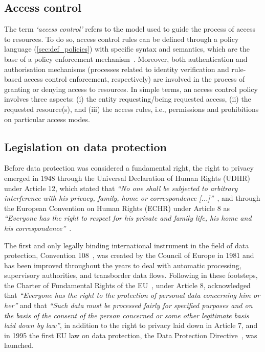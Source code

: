 \subsection{Access control}
\label{sec:def_access_control}

The term \textit{`access control'} refers to the model used to guide the process of access to resources. To do so, access control rules can be defined through a policy language (\ref{sec:def_policies}) with specific syntax and semantics, which are the base of a policy enforcement mechanism~\citep{cuenca_grau_access_2017}. Moreover, both authentication and authorisation mechanisms (processes related to identity verification and rule-based access control enforcement, respectively) are involved in the process of granting or denying access to resources. In simple terms, an access control policy involves three aspects: (i) the entity requesting/being requested access, (ii) the requested resource(s), and (iii) the access rules, i.e., permissions and prohibitions on particular access modes.

\subsection{Legislation on data protection}
\label{sec:def_data_protection_law}

Before data protection was considered a fundamental right, the right to privacy emerged in 1948 through the Universal Declaration of Human Rights (UDHR) under Article 12, which stated that \textit{``No one shall be subjected to arbitrary interference with his privacy, family, home or correspondence [...]''}~\citep{united_nations_general_assembly_universal_1948}, and through the European Convention on Human Rights (ECHR) under Article 8 as \textit{``Everyone has the right to respect for his private and family life, his home and his correspondence''}~\citep{council_of_europe_european_1950}.

The first and only legally binding international instrument in the field of data protection, Convention 108~\citep{council_of_europe_convention_1981}, was created by the Council of Europe in 1981 and has been improved throughout the years to deal with automatic processing, supervisory authorities, and transborder data flows.
Following in these footsteps, the Charter of Fundamental Rights of the EU~\citeyearpar{noauthor_charter_2000}, under Article 8, acknowledged that \textit{``Everyone has the right to the protection of personal data concerning him or her''} and that \textit{``Such data must be processed fairly for specified purposes and on the basis of the consent of the person concerned or some other legitimate basis laid down by law''}, in addition to the right to privacy laid down in Article 7, and in 1995 the first EU law on data protection, the Data Protection Directive~\citeyearpar{noauthor_directive_1995}, was launched.

